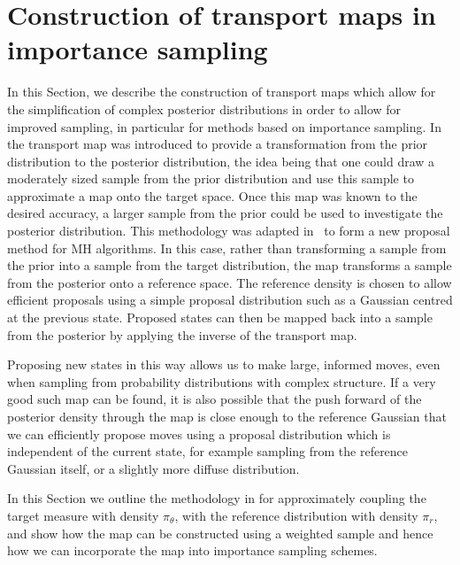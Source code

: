 \documentclass[final]{siamltex}
\begin{document}
\section{Construction of transport maps in importance sampling} \label{sec:map}
In this Section, we describe the construction of transport maps which
allow for the simplification of complex posterior distributions in
order to allow for improved sampling, in particular for methods based
on importance sampling.
In~\cite{el2012bayesian} the transport map was introduced to provide a transformation from the prior
distribution to the posterior distribution, the idea being that one could draw a moderately sized
sample from the prior distribution and use this sample to approximate a map onto the target space.
Once this map was known to the desired accuracy, a larger sample from the prior could be used to
investigate the posterior distribution. This
methodology was adapted in~\cite{parno2014transport} to form a new proposal method for MH
algorithms. In this case, rather than transforming a sample from the prior into a sample from the target
distribution, the map transforms a sample from the posterior onto a reference space.
The reference density is chosen to allow efficient proposals using a simple proposal
distribution such as a Gaussian centred at the previous state. Proposed states can then be mapped back into a sample from the posterior by applying the inverse of the transport map.

Proposing new states in this way allows us to make large, informed
moves, even when sampling from probability distributions with complex structure.
If a very good such map can be found, it is also possible that the
push forward of the posterior density through the map is close enough
to the reference Gaussian that we can efficiently
propose moves using a proposal distribution which is independent of
the current state, for example sampling from the reference Gaussian
itself, or a slightly more diffuse distribution.

In this Section we outline the methodology in
\cite{parno2014transport} for approximately coupling the target
measure with density
$\pi_{\theta}$, with the reference distribution with density $\pi_r$, and
show how the map can be constructed using a weighted sample
and hence how we can incorporate the map into importance sampling schemes.
\end{document}
